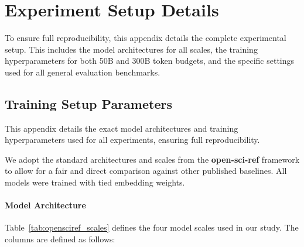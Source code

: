 \section{Experiment Setup Details}
\label{app:exp_setup}
To ensure full reproducibility, this appendix details the complete experimental setup. This includes the model architectures for all scales, the training hyperparameters for both 50B and 300B token budgets, and the specific settings used for all general evaluation benchmarks.







\subsection{Training Setup Parameters}
\label{app:hyperparams}

This appendix details the exact model architectures and training hyperparameters used for all experiments, ensuring full reproducibility. 

We adopt the standard architectures and scales from the \textbf{open-sci-ref} framework to allow for a fair and direct comparison against other published baselines. All models were trained with tied embedding weights. 

\paragraph{Model Architecture}
Table~\ref{tab:opensciref_scales} defines the four model scales used in our study. The columns are defined as follows:


